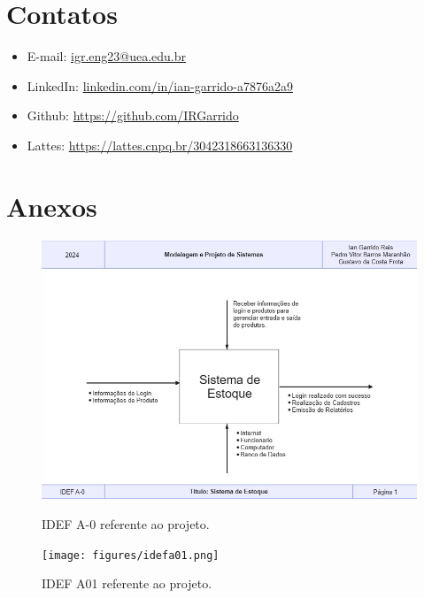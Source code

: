 \documentclass[12pt]{article}
\begin{document}
\section*{Contatos}
\begin{itemize}
    \item E-mail: \href{mailto:igr.eng23@uea.edu.br}{igr.eng23@uea.edu.br}
    \item LinkedIn: \href{https://www.linkedin.com/in/ian-garrido-a7876a2a9?utm_source=share&utm_campaign=share_via&utm_content=profile&utm_medium=android_app}{linkedin.com/in/ian-garrido-a7876a2a9}
    \item Github: \href{https://github.com/IRGarrido}{https://github.com/IRGarrido}
    \item Lattes: \href{https://lattes.cnpq.br/3042318663136330}{https://lattes.cnpq.br/3042318663136330}
\end{itemize}

\clearpage
\section*{Anexos}
    \begin{figure}[htbp]
        \centering
        \caption{IDEF A-0 referente ao projeto.}
        \includegraphics[width=0.8\linewidth]{figures/idefa-0.png}
        \label{fig:figura1}
    \end{figure}

    \begin{figure}
        \centering
        \caption{IDEF A01 referente ao projeto.}
        \texttt{[image: figures/idefa01.png]}
        \label{fig:figura2}
    \end{figure}
 
\end{document}
